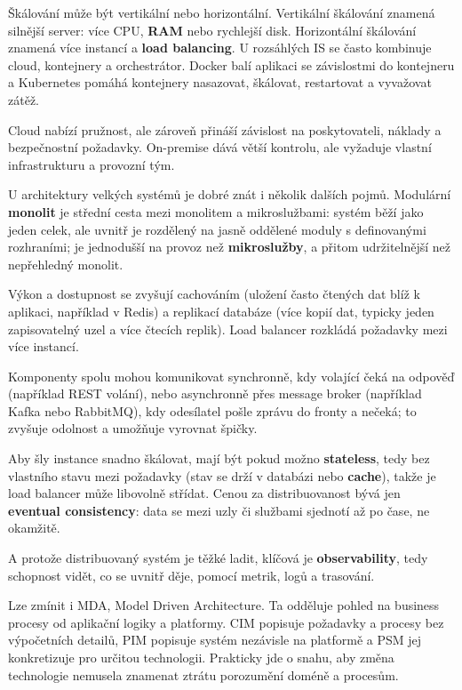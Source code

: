 \documentclass[11pt,a4paper]{article}
\begin{document}
Škálování může být vertikální nebo horizontální. Vertikální škálování znamená silnější server: více CPU, \textbf{RAM} nebo rychlejší disk. Horizontální škálování znamená více instancí a \textbf{load balancing}. U rozsáhlých IS se často kombinuje cloud, kontejnery a orchestrátor. Docker balí aplikaci se závislostmi do kontejneru a Kubernetes pomáhá kontejnery nasazovat, škálovat, restartovat a vyvažovat zátěž.

Cloud nabízí pružnost, ale zároveň přináší závislost na poskytovateli, náklady a bezpečnostní požadavky. On-premise dává větší kontrolu, ale vyžaduje vlastní infrastrukturu a provozní tým.

U architektury velkých systémů je dobré znát i několik dalších pojmů. Modulární \textbf{monolit} je střední cesta mezi monolitem a mikroslužbami: systém běží jako jeden celek, ale uvnitř je rozdělený na jasně oddělené moduly s definovanými rozhraními; je jednodušší na provoz než \textbf{mikroslužby}, a přitom udržitelnější než nepřehledný monolit.

Výkon a dostupnost se zvyšují cachováním (uložení často čtených dat blíž k aplikaci, například v Redis) a replikací databáze (více kopií dat, typicky jeden zapisovatelný uzel a více čtecích replik). Load balancer rozkládá požadavky mezi více instancí.

Komponenty spolu mohou komunikovat synchronně, kdy volající čeká na odpověď (například REST volání), nebo asynchronně přes message broker (například Kafka nebo RabbitMQ), kdy odesílatel pošle zprávu do fronty a nečeká; to zvyšuje odolnost a umožňuje vyrovnat špičky.

Aby šly instance snadno škálovat, mají být pokud možno \textbf{stateless}, tedy bez vlastního stavu mezi požadavky (stav se drží v databázi nebo \textbf{cache}), takže je load balancer může libovolně střídat. Cenou za distribuovanost bývá jen \textbf{eventual consistency}: data se mezi uzly či službami sjednotí až po čase, ne okamžitě.

A protože distribuovaný systém je těžké ladit, klíčová je \textbf{observability}, tedy schopnost vidět, co se uvnitř děje, pomocí metrik, logů a trasování.

Lze zmínit i MDA, Model Driven Architecture. Ta odděluje pohled na business procesy od aplikační logiky a platformy. CIM popisuje požadavky a procesy bez výpočetních detailů, PIM popisuje systém nezávisle na platformě a PSM jej konkretizuje pro určitou technologii. Prakticky jde o snahu, aby změna technologie nemusela znamenat ztrátu porozumění doméně a procesům.
\end{document}
